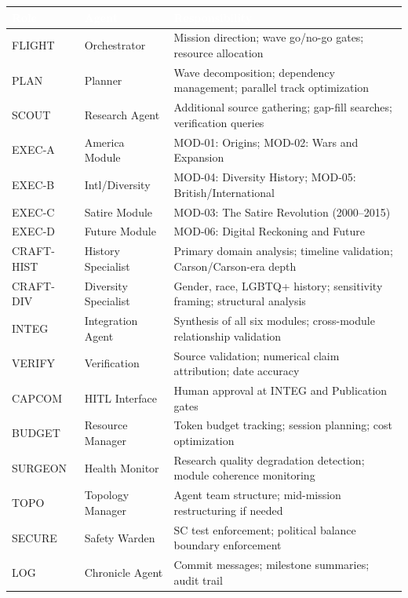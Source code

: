 \documentclass[11pt,letterpaper]{article}
\newcommand{\tableheader}[1]{\textbf{\sffamily\textcolor{white}{#1}}}
\begin{document}
\begin{center}
\begin{tabularx}{\textwidth}{L{1.8cm}L{2.2cm}X}
\toprule
{}
\tableheader{Role} & \tableheader{Agent} & \tableheader{Responsibility} \\
\midrule
FLIGHT & Orchestrator & Mission direction; wave go/no-go gates; resource allocation \\
PLAN & Planner & Wave decomposition; dependency management; parallel track optimization \\
SCOUT & Research Agent & Additional source gathering; gap-fill searches; verification queries \\
EXEC-A & America Module & MOD-01: Origins; MOD-02: Wars and Expansion \\
EXEC-B & Intl/Diversity & MOD-04: Diversity History; MOD-05: British/International \\
EXEC-C & Satire Module & MOD-03: The Satire Revolution (2000--2015) \\
EXEC-D & Future Module & MOD-06: Digital Reckoning and Future \\
CRAFT-HIST & History Specialist & Primary domain analysis; timeline validation; Carson/Carson-era depth \\
CRAFT-DIV & Diversity Specialist & Gender, race, LGBTQ+ history; sensitivity framing; structural analysis \\
INTEG & Integration Agent & Synthesis of all six modules; cross-module relationship validation \\
VERIFY & Verification & Source validation; numerical claim attribution; date accuracy \\
CAPCOM & HITL Interface & Human approval at INTEG and Publication gates \\
BUDGET & Resource Manager & Token budget tracking; session planning; cost optimization \\
SURGEON & Health Monitor & Research quality degradation detection; module coherence monitoring \\
TOPO & Topology Manager & Agent team structure; mid-mission restructuring if needed \\
SECURE & Safety Warden & SC test enforcement; political balance boundary enforcement \\
LOG & Chronicle Agent & Commit messages; milestone summaries; audit trail \\
\bottomrule
\end{tabularx}
\end{center}
\end{document}
